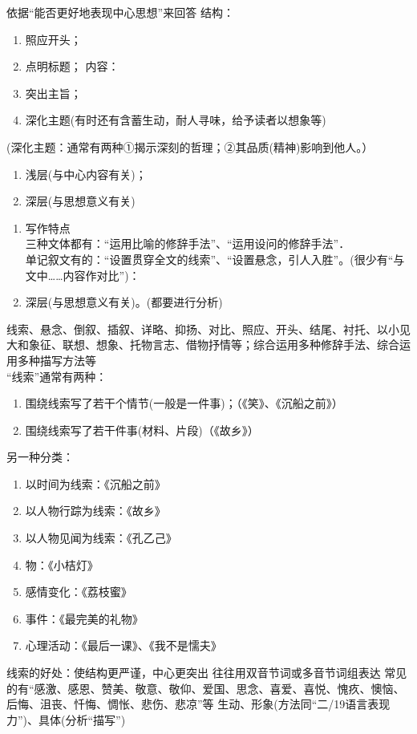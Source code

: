   依据``能否更好地表现中心思想''来回答
  结构：\begin{enumerate}\item 照应开头；
        \item 点明标题；
  内容：\item 突出主旨；
        \item 深化主题(有时还有含蓄生动，耐人寻味，给予读者以想象等)\end{enumerate}
        (深化主题：通常有两种①揭示深刻的哲理；②其品质(精神)影响到他人。）

\begin{enumerate}
\item 浅层(与中心内容有关)；
\item 深层(与思想意义有关)
\end{enumerate}
\begin{enumerate}
\item 写作特点\\
    三种文体都有：``运用比喻的修辞手法''、``运用设问的修辞手法''．\\
    单记叙文有的：``设置贯穿全文的线索''、``设置悬念，引人入胜''。(很少有``与文中\ldots{}\ldots{}内容作对比'')：\\
\item 深层(与思想意义有关)。(都要进行分析)
\end{enumerate}
  线索、悬念、倒叙、插叙、详略、抑扬、对比、照应、开头、结尾、衬托、以小见大和象征、联想、想象、托物言志、借物抒情等；综合运用多种修辞手法、综合运用多种描写方法等\\
 ``线索''通常有两种：\begin{enumerate}\item 围绕线索写了若干个情节(一般是一件事)；（《笑》、《沉船之前》）
                      \item 围绕线索写了若干件事(材料、片段)（《故乡》）\end{enumerate}
  另一种分类：\begin{enumerate}\item 以时间为线索：《沉船之前》
              \item 以人物行踪为线索：《故乡》
              \item 以人物见闻为线索：《孔乙己》
              \item 物：《小桔灯》
              \item 感情变化：《荔枝蜜》
              \item 事件：《最完美的礼物》
              \item 心理活动：《最后一课》、《我不是懦夫》\end{enumerate}
线索的好处：使结构更严谨，中心更突出
  往往用双音节词或多音节词组表达
  常见的有``感激、感恩、赞美、敬意、敬仰、爱国、思念、喜爱、喜悦、愧疚、懊恼、后悔、沮丧、忏悔、惆怅、悲伤、悲凉''等
  生动、形象(方法同``二/19语言表现力'')、具体(分析``描写'')

